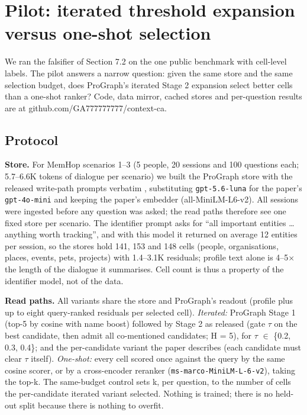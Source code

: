 \documentclass[11pt]{article}
\begin{document}
\section{Pilot: iterated threshold expansion versus one-shot selection}

We ran the falsifier of Section 7.2 on the one public benchmark with cell-level labels. The pilot answers a narrow question: given the same store and the same selection budget, does ProGraph's iterated Stage 2 expansion select better cells than a one-shot ranker? Code, data mirror, cached stores and per-question results are at github.com/GA777777777/context-ca.

\subsection{Protocol}

\textbf{Store.} For MemHop scenarios 1--3 (5 people, 20 sessions and 100 questions each; 5.7--6.6K tokens of dialogue per scenario) we built the ProGraph store with the released write-path prompts verbatim \cite{prograph}, substituting \texttt{gpt-5.6-luna} for the paper's \texttt{gpt-4o-mini} and keeping the paper's embedder (all-MiniLM-L6-v2). All sessions were ingested before any question was asked; the read paths therefore see one fixed store per scenario. The identifier prompt asks for ``all important entities \ldots{} anything worth tracking'', and with this model it returned on average 12 entities per session, so the stores hold 141, 153 and 148 cells (people, organisations, places, events, pets, projects) with 1.4--3.1K residuals; profile text alone is 4--5$\times$ the length of the dialogue it summarises. Cell count is thus a property of the identifier model, not of the data.

\textbf{Read paths.} All variants share the store and ProGraph's readout (profile plus up to eight query-ranked residuals per selected cell). \emph{Iterated:} ProGraph Stage 1 (top-5 by cosine with name boost) followed by Stage 2 as released (gate $\tau$ on the best candidate, then admit all co-mentioned candidates; H = 5), for $\tau$ $\in$ \{0.2, 0.3, 0.4\}; and the per-candidate variant the paper describes (each candidate must clear $\tau$ itself). \emph{One-shot:} every cell scored once against the query by the same cosine scorer, or by a cross-encoder reranker (\texttt{ms-marco-MiniLM-L-6-v2}), taking the top-k. The same-budget control sets k, per question, to the number of cells the per-candidate iterated variant selected. Nothing is trained; there is no held-out split because there is nothing to overfit.
\end{document}
